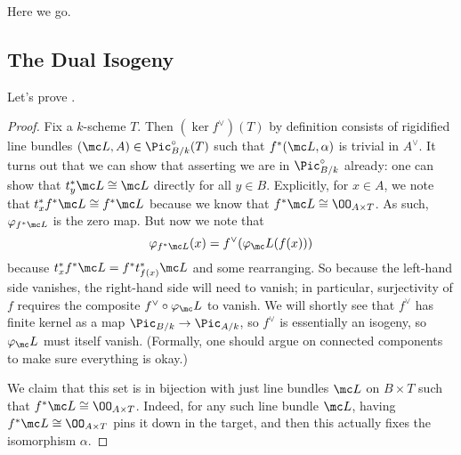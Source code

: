 \documentclass[../notes.tex]{subfiles}
\begin{document}
Here we go.

\subsection{The Dual Isogeny}
Let's prove .
\dualmapthm*
\begin{proof}
	Fix a $k$-scheme $T$. Then $(\ker f^\lor)(T)$ by definition consists of rigidified line bundles $(\mc L,A)\in\Pic_{B/k}^\circ(T)$ such that $f^*(\mc L,\alpha)$ is trivial in $A^\lor$. It turns out that we can show that asserting we are in $\Pic_{B/k}^\circ$ already: one can show that $t_y^*\mc L\cong\mc L$ directly for all $y\in B$. Explicitly, for $x\in A$, we note that $t_x^*f^*\mc L\cong f^*\mc L$ because we know that $f^*\mc L\cong\OO_{A\times T}$. As such, $\varphi_{f^*\mc L}$ is the zero map. But now we note that
	\[\varphi_{f^*\mc L}(x)=f^\lor(\varphi_\mc L(f(x)))\]
	because $t_x^*f^*\mc L=f^*t_{f(x)}^*\mc L$ and some rearranging. So because the left-hand side vanishes, the right-hand side will need to vanish; in particular, surjectivity of $f$ requires the composite $f^\lor\circ\varphi_\mc L$ to vanish. We will shortly see that $f^\lor$ has finite kernel as a map ${\Pic_{B/k}}\to{\Pic_{A/k}}$, so $f^\lor$ is essentially an isogeny, so $\varphi_\mc L$ must itself vanish. (Formally, one should argue on connected components to make sure everything is okay.)
	
	We claim that this set is in bijection with just line bundles $\mc L$ on $B\times T$ such that $f^*\mc L\cong\OO_{A\times T}$. Indeed, for any such line bundle $\mc L$, having $f^*\mc L\cong\OO_{A\times T}$ pins it down in the target, and then this actually fixes the isomorphism $\alpha$.


\end{proof}
\end{document}
